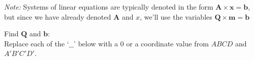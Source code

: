 \begin{enumerate}[(a)]
\emph{Note:} Systems of linear equations are typically denoted in the form $\mathbf{A} \times \mathbf{x} = \mathbf{b}$, but since we have already denoted $\mathbf{A}$ and $x$, we'll use the variables $\mathbf{Q} \times \mathbf{m} = \mathbf{b}$

\begin{tcolorbox}[colback=orange!5!white,colframe=orange!75!black]
Find $\mathbf{Q}$ and $\mathbf{b}$:\\

Replace each of the `$\_\_$' below with a $0$ or a coordinate value from $ABCD$ and $A'B'C'D'$.
\end{tcolorbox}

\end{enumerate}
